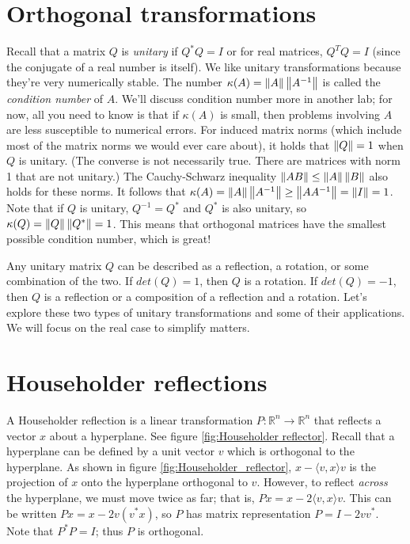 \label{lab:Canonical Transformations}

\section*{Orthogonal transformations}
Recall that a matrix $Q$ is \emph{unitary} if $Q^* Q = I$ or for real matrices, 
$Q^T Q = I$ (since the conjugate of a real number is itself).
We like unitary transformations because they're very numerically stable.
The number $\kappa(A) = \left\lVert A\right\rVert \left\lVert A^{-1}\right\rVert$ is called the \emph{condition number} of $A$.
We'll discuss condition number more in another lab; for now, all you need to know is that if $\kappa(A)$ is small, then problems involving $A$ are less susceptible to numerical errors.
For induced matrix norms (which include most of the matrix norms we would ever care about), it holds that $\left\lVert Q\right\rVert=1$ when $Q$ is unitary.
(The converse is not necessarily true.
There are matrices with norm 1 that are not unitary.)
The Cauchy-Schwarz inequality $\left\lVert AB\right\rVert \leq \left\lVert A\right\rVert \left\lVert B\right\rVert$ also holds for these norms.
It follows that $\kappa(A) = \left\lVert A\right\rVert \left\lVert A^{-1}\right\rVert \geq \left\lVert A A^{-1}\right\rVert = \left\lVert I\right\rVert = 1$.
Note that if $Q$ is unitary, $Q^{-1} = Q^*$ and $Q^*$ is also unitary, so $\kappa(Q) = \left\lVert Q\right\rVert \left\lVert Q^*\right\rVert = 1$.
This means that orthogonal matrices have the smallest possible condition number, which is great!

Any unitary matrix $Q$ can be described as a reflection, a rotation, or some combination of the two.
If $det(Q) = 1$, then $Q$ is a rotation.
If $det(Q) = -1$, then $Q$  is a reflection or a composition of a reflection and a rotation.
Let's explore these two types of unitary transformations and some of their applications.
We will focus on the real case to simplify matters.

\section*{Householder reflections}
A Householder reflection is a linear transformation $P: \mathbb{R}^n \rightarrow \mathbb{R}^n$ that reflects a vector $x$ about a hyperplane.
See figure \ref{fig:Householder reflector}.
Recall that a hyperplane can be defined by a unit vector $v$ which is orthogonal to the hyperplane.
As shown in figure \ref{fig:Householder_reflector}, $x - \langle v,x \rangle v$ is the projection of $x$ onto the hyperplane orthogonal to $v$.
However, to reflect \emph{across} the hyperplane, we must move twice as far; that is, $Px = x - 2\langle v,x \rangle v$.
This can be written $Px = x - 2v(v^\ast x)$, so $P$ has matrix representation $P = I - 2vv^\ast$.
Note that $P^\ast P = I$; thus $P$ is orthogonal.

